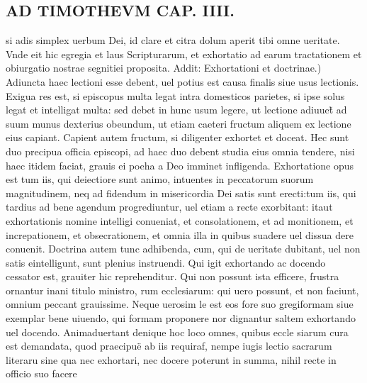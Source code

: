 \documentclass{article}
\begin{document}
\begin{pages}
\section*{AD TIMOTHEVM CAP. IIII. }
\marginpar{[ p.102 ]}\pstart si adis simplex uerbum Dei, id clare et citra dolum aperit tibi omne ueritate. Vnde eit hic egregia et laus Scripturarum, et exhortatio ad earum tractationem et obiurgatio nostrae segnitiei proposita. Addit:  \pend\pstart Exhortationi et doctrinae.) Adiuncta haec lectioni esse debent, uel potius est causa finalis siue usus lectionis. Exigua res est, si episcopus multa legat intra domesticos parietes, si ipse solus legat et intelligat multa: sed debet in hunc usum legere, ut lectione adiuuet̃ ad suum munus dexterius obeundum, ut etiam caeteri fructum aliquem ex lectione eius capiant. Capient autem fructum, si diligenter exhortet et doceat. Hec sunt duo precipua officia episcopi, ad haec duo debent studia eius omnia tendere, nisi haec itidem faciat, grauis ei poeha a Deo imminet infligenda. Exhortatione opus est tum iis, qui deiectiore sunt animo, intuentes in peccatorum suorum magnitudinem, neq ad fidendum in misericordia Dei satis sunt erecti:tum iis, qui tardius ad bene agendum progrediuntur, uel etiam a recte exorbitant: itaut exhortationis nomine intelligi conueniat, et consolationem, et ad monitionem, et increpationem, et obsecrationem, et omnia illa in quibus suadere uel dissua dere conuenit. Doctrina autem tunc adhibenda, cum, qui de ueritate dubitant, uel non satis eintelligunt, sunt plenius instruendi. Qui igit exhortando ac docendo cessator est, grauiter hic reprehenditur. Qui non possunt ista efficere, frustra ornantur inani titulo ministro, rum ecclesiarum: qui uero possunt, et non faciunt, omnium peccant grauissime. Neque uerosim le est eos fore suo gregiformam siue exemplar bene uiuendo, qui formam proponere nor dignantur saltem exhortando uel docendo. Animaduertant denique hoc loco omnes, quibus eccle siarum cura est demandata, quod praecipuë ab iis requiraf, nempe iugis lectio sacrarum literaru sine qua nec exhortari, nec docere poterunt in summa, nihil recte in officio suo facere  \pend
{}
{}

\end{pages}
\end{document}
